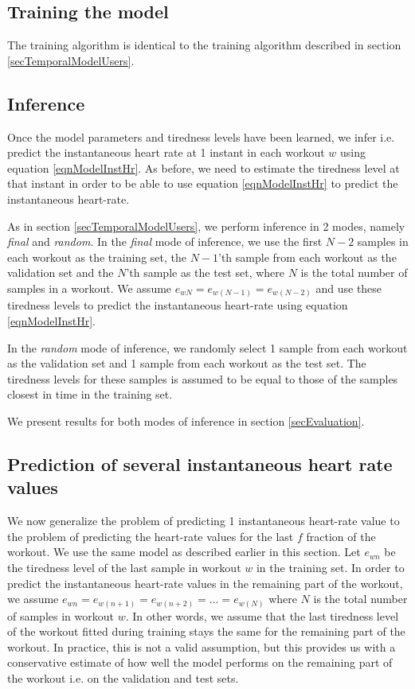 \documentclass{acm_proc_article-sp}
\begin{document}
\subsection{Training the model}
The training algorithm is identical to the training algorithm described in section \ref{secTemporalModelUsers}.

\subsection{Inference}
Once the model parameters and tiredness levels have been learned, we infer i.e. predict the instantaneous heart rate at 1 instant in each workout $w$ using equation \ref{eqnModelInstHr}. As before, we need to estimate the tiredness level at that instant in order to be able to use equation \ref{eqnModelInstHr} to predict the instantaneous heart-rate. 

As in section \ref{secTemporalModelUsers}, we perform inference in  2 modes, namely \emph{final} and \emph{random}.  In the \emph{final} mode of inference, we use the first $N-2$ samples in each workout as the training set, the $N-1$'th sample from each workout as the validation set and the $N$'th sample as the test set, where $N$ is the total number of samples in a workout. We assume $e_{wN} = e_{w(N-1)} = e_{w(N-2)}$ and use these tiredness levels to predict the instantaneous heart-rate using equation \ref{eqnModelInstHr}.

In the \emph{random} mode of inference, we randomly select 1 sample from each workout as the validation set and 1 sample from each workout as the test set. The tiredness levels for these samples is assumed to be equal to those of the samples closest in time in the training set. 

We present results for both modes of inference in section \ref{secEvaluation}.

\subsection{Prediction of several instantaneous heart rate values}
We now generalize the problem of predicting 1 instantaneous heart-rate value to the problem of predicting the heart-rate values for the last $f$ fraction of the workout. We use the same model as described earlier in this section. Let $e_{wn}$ be the tiredness level of the last sample in workout $w$ in the training set. In order to predict the instantaneous heart-rate values in the remaining part of the workout, we assume $e_{wn} = e_{w(n+1)} = e_{w(n+2)} = ... = e_{w(N)}$ where $N$ is the total number of samples in workout $w$. In other words, we assume that the last tiredness level of the workout fitted during training stays the same for the remaining part of the workout. In practice, this is not a valid assumption, but this provides us with a conservative estimate of how well the model performs on the remaining part of the workout i.e. on the validation and test sets.
\end{document}
